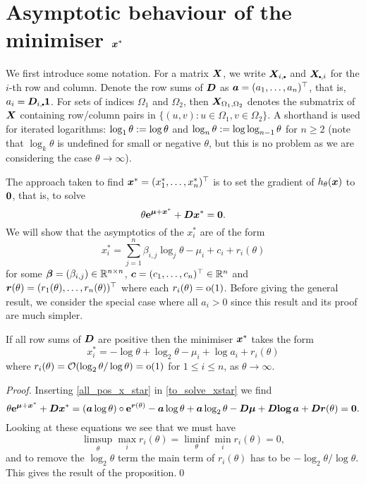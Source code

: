 \section{Asymptotic behaviour of the minimiser $\bm{x}^*$} \label{sec:x_star_asymp_}

We first introduce some notation. For a matrix $\bm{X}$, we write
$\bfX_{i,\sbullet}$ and $\bfX_{\sbullet,i}$ for the $i$-th row and
column. Denote the row sums of $\bm{D}$ as $\bm{a} = (a_1,\dots,a_n)^\top$, that
is, $a_i=\bfD_{i,\sbullet} \bfone$. For sets of indices $\Omega_1$ and
$\Omega_2$, then $\bm{X}_{\Omega_1,\Omega_2}$ denotes the submatrix of $\bm{X}$
containing row/column pairs in $\{ (u,v) : u \in \Omega_1, v \in \Omega_2\}$.
A shorthand is used for iterated logarithms: $\log_1 \theta := \log
\theta$ and $\log_n \theta := \log \log_{n-1} \theta$ for $n \ge 2$ (note
that $\log_k \theta$ is undefined for small or negative $\theta$, but this
is no problem as we are considering the case $\theta \to \infty$).

The approach taken to find $\bm{x}^*=(x_1^*,\dots,x_n^*)^\top$ is to set the
gradient of $h_\theta(\bm{x})$ to $\bm{0}$, that is, to solve
\begin{equation} \label{to_solve_xstar}
	\theta \text{\bf{e}}^{\bm{\mu} + \bm{x}^*} + \bm{D} \bm{x}^* = \bm{0} .
\end{equation}
We will show that the asymptotics of the $x_i^*$ are of the form
\begin{equation} \label{general_form}
	x_i^* = \sum_{j=1}^{n} \beta_{i,j} \log_j \theta - \mu_i + c_i + r_i(\theta)
\end{equation}
for some $\bm{\beta} = (\beta_{i,j}) \in \mathbb{R}^{n \times n}$, $\bm{c} = (c_1, \dots,
c_n)^\top \in \mathbb{R}^n$ and $\bm{r}(\theta) = (r_1(\theta), \dots, r_n(\theta))^\top$
where each $r_i(\theta) = {\mathrm{o}}(1)$.  Before giving the general result, we
consider the special case where all $a_i>0$ since this result and its proof
are much simpler.

\begin{proposition} \label{all_pos_prop}
If all row sums of $\bm{D}$ are positive then the minimiser $\bm{x}^*$ takes the form
\begin{equation} \label{all_pos_x_star}
    x_i^* = {-}\log \theta + \log_2 \theta - \mu_i + \log a_i + r_i(\theta)
\end{equation}
where $r_i(\theta) = {\mathcal{O}}(\log_2 \theta / \log \theta) = {\mathrm{o}}(1)$ for $1 \leq i
\leq n$, as $\theta \to \infty$.
\end{proposition}

\begin{proof}
Inserting \eqref{all_pos_x_star} in \eqref{to_solve_xstar} we find
\[
    \theta \text{\bf{e}}^{\bm{\mu} + \bm{x}^*} + \bm{D} \bm{x}^*
    = (\bm{a} \log \theta) \circ \text{\bf{e}}^{\bm{r}(\theta)} - \bm{a} \log \theta
+ \bm{a} \log_2 \theta - \bm{D}  \bm{\mu} + \bm{D}  \text{\bf{log}}\, \bm{a} + \bm{D} \bm{r}(\theta) = \bm{0} .
\]
Looking at these equations we see that we must have
%
\[
 \limsup_\theta \max_i r_i(\theta) = \liminf_\theta \min_i r_i(\theta) = 0,
\]
%
and to remove the $\log_2 \theta$ term the main term of $r_i(\theta)$ has to
be $-\log_2 \theta /\log \theta$. This gives the result of the
proposition.\qed
\end{proof}

